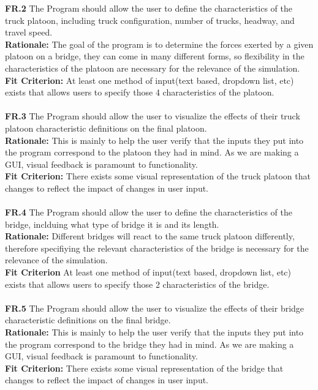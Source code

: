 \documentclass[12pt]{article}
\begin{document}
  \textbf{FR.2} The Program should allow the user to define the characteristics of the truck platoon, including truck configuration, number of trucks, headway, and travel speed.\\
  \textbf{Rationale:} The goal of the program is to determine the forces exerted by a given platoon on a bridge, they can come in many different forms, so flexibility in the characteristics
  of the platoon are necessary for the relevance of the simulation.\\ 
  \textbf{Fit Criterion:} At least one method of input(text based, dropdown list, etc) exists that allows users to specify those 4 characteristics of the platoon.\\\\

  \textbf{FR.3} The Program should allow the user to visualize the effects of their truck platoon characteristic definitions on the final platoon.\\
  \textbf{Rationale:} This is mainly to help the user verify that the inputs they put into the program correspond to the platoon they had in mind. As we are making a GUI,
  visual feedback is paramount to functionality.\\
  \textbf{Fit Criterion:} There exists some visual representation of the truck platoon that changes to reflect the impact of changes in user input.\\\\

  \textbf{FR.4} The Program should allow the user to define the characteristics of the bridge, inclduing what type of bridge it is and its length.\\
  \textbf{Rationale:} Different bridges will react to the same truck platoon differently, therefore specifiying the relevant characteristics of the bridge is necessary for
  the relevance of the simulation.\\
  \textbf{Fit Criterion} At least one method of input(text based, dropdown list, etc) exists that allows users to specify those 2 characteristics of the bridge.\\\\
  
  \textbf{FR.5} The Program should allow the user to visualize the effects of their bridge characteristic definitions on the final bridge.\\
  \textbf{Rationale:} This is mainly to help the user verify that the inputs they put into the program correspond to the bridge they had in mind. As we are making a GUI,
  visual feedback is paramount to functionality.\\
  \textbf{Fit Criterion:} There exists some visual representation of the bridge that changes to reflect the impact of changes in user input.\\\\ 
\end{document}

